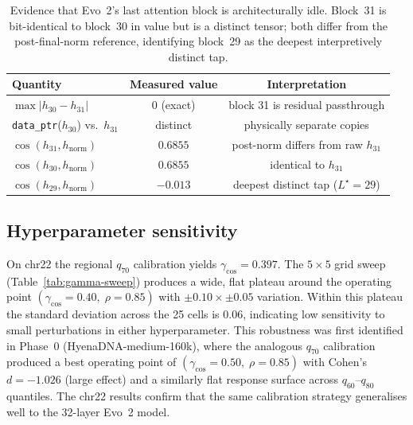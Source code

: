 \documentclass{article}
\theoremstyle{plain}
\theoremstyle{definition}
\theoremstyle{remark}
\newcommand{\hnorm}{h_{\mathrm{norm}}}
\begin{document}
\begin{table}[!htbp]
\caption{Evidence that Evo~2's last attention block is architecturally
idle. Block~31 is bit-identical to block~30 in value but is a distinct
tensor; both differ from the post-final-norm reference, identifying
block~29 as the deepest interpretively distinct tap.}
\label{tab:idle-block}
\centering
\small
\begin{tabular}{@{}lcc@{}}
\toprule
Quantity & Measured value & Interpretation \\
\midrule
$\max\bigl|h_{30}-h_{31}\bigr|$ & $0$ (exact) &
   block 31 is residual passthrough \\
\texttt{data\_ptr}($h_{30}$) vs.\ $h_{31}$ & distinct &
   physically separate copies \\
$\cos(h_{31}, \hnorm)$ & $0.6855$ &
   post-norm differs from raw $h_{31}$ \\
$\cos(h_{30}, \hnorm)$ & $0.6855$ &
   identical to $h_{31}$ \\
$\cos(h_{29}, \hnorm)$ & $-0.013$ &
   deepest distinct tap ($L^{\star}=29$) \\
\bottomrule
\end{tabular}
\end{table}



\subsection{Hyperparameter sensitivity}
\label{app:gamma-sweep}

On chr22 the regional $q_{70}$ calibration yields
$\gamma_{\cos} = 0.397$. The $5\times 5$ grid sweep
(Table~\ref{tab:gamma-sweep}) produces a wide, flat plateau around the
operating point $(\gamma_{\cos}\!=\!0.40,\; \rho\!=\!0.85)$ with
$\pm 0.10 \times \pm 0.05$ variation. Within this plateau the standard
deviation across the 25 cells is $0.06$, indicating low sensitivity to
small perturbations in either hyperparameter. This robustness was first
identified in Phase~0 (HyenaDNA-medium-160k), where the analogous
$q_{70}$ calibration produced a best operating point of
$(\gamma_{\cos}\!=\!0.50,\; \rho\!=\!0.85)$ with Cohen's $d = -1.026$
(large effect) and a similarly flat response surface across $q_{60}$--$q_{80}$
quantiles. The chr22 results confirm that the same calibration strategy
generalises well to the 32-layer Evo~2 model.
\end{document}
